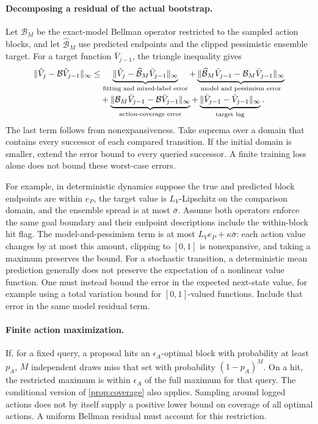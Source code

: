 \documentclass{article}
\theoremstyle{definition}
\theoremstyle{remark}
\begin{document}
\paragraph{Decomposing a residual of the actual bootstrap.}
Let $\mathcal B_M$ be the exact-model Bellman operator restricted to the sampled
action blocks, and let $\widehat{\mathcal B}_M$ use predicted endpoints and the
clipped pessimistic ensemble target. For a target function $\bar V_{j-1}$,
the triangle inequality gives
\begin{align}
 \|\hat V_j-\mathcal B\hat V_{j-1}\|_\infty
 &\le
 \underbrace{\|\hat V_j-\widehat{\mathcal B}_M\bar V_{j-1}\|_\infty}_{\text{fitting and mixed-label error}}
 +\underbrace{\|\widehat{\mathcal B}_M\bar V_{j-1}
                  -\mathcal B_M\bar V_{j-1}\|_\infty}_{\text{model and pessimism error}}
 \notag\\[-2pt]
 &\quad+
 \underbrace{\|\mathcal B_M\bar V_{j-1}
                  -\mathcal B\bar V_{j-1}\|_\infty}_{\text{action-coverage error}}
 +\underbrace{\|\bar V_{j-1}-\hat V_{j-1}\|_\infty}_{\text{target lag}} .
 \label{eq:residual-decomposition}
\end{align}
The last term follows from nonexpansiveness.
Take suprema over a domain that contains every successor of each compared transition.
If the initial domain is smaller, extend the error bound to every queried successor.
A finite training loss alone does not bound these worst-case errors.

For example, in deterministic dynamics suppose the true and predicted block endpoints
are within $e_P$, the target value is $L_V$-Lipschitz on the comparison domain, and the
ensemble spread is at most $\bar\sigma$. Assume both operators enforce the same
goal boundary and their endpoint descriptions include the within-block hit flag.
The model-and-pessimism term is at most
$L_Ve_P+\kappa\bar\sigma$: each action value changes by at most this amount,
clipping to $[0,1]$ is nonexpansive, and taking a maximum preserves the bound.
For a stochastic transition, a deterministic mean prediction generally does not
preserve the expectation of a nonlinear value function.
One must instead bound the error in the expected next-state value, for example using
a total variation bound for $[0,1]$-valued functions. Include that error in the same
model residual term.

\paragraph{Finite action maximization.}
If, for a fixed query, a proposal hits an $\epsilon_A$-optimal block with probability
at least $p_A$, $M$ independent draws miss that set with probability
$(1-p_A)^M$. On a hit, the restricted maximum is within $\epsilon_A$ of the full
maximum for that query. The conditional version of \cref{prop:coverage} also applies.
Sampling around logged actions does not by itself supply a positive lower bound on
coverage of all optimal actions. A uniform Bellman residual must account for this
restriction.
\end{document}
